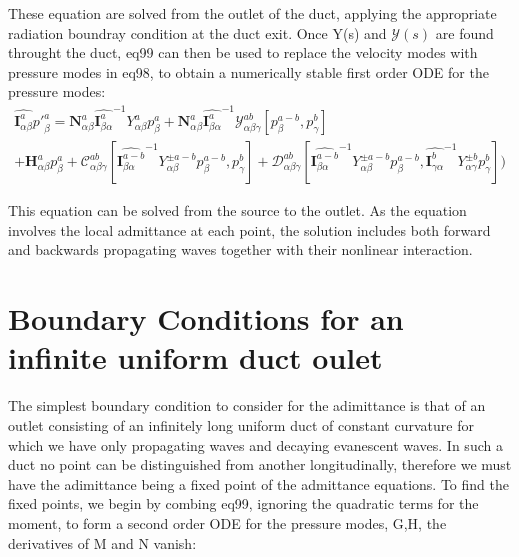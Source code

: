 \documentclass{Note}
\begin{document}
These equation are solved from the outlet of the duct, applying the appropriate radiation boundray condition at the duct exit. Once Y(s) and $\mathcal{Y}(s)$ are found throught the duct, eq99 can then be used to replace the velocity modes with pressure modes in eq98, to obtain a numerically stable first order ODE for the pressure modes:
\begin{equation}
\begin{aligned}
\widehat{\textbf{I}_{\alpha\beta}^a} {p'}_\beta^a=\textbf{N}_{\alpha\beta}^a {\widehat{\textbf{I}_{\beta \alpha}^a}}^{-1}  Y_{\alpha\beta}^a p_\beta^a +\textbf{N}_{\alpha\beta}^a {\widehat{\textbf{I}_{\beta \alpha}^a}}^{-1} \mathcal{Y}_{\alpha\beta\gamma}^{ab}[p_{\beta}^{a-b},p_{\gamma}^{b}]\\
+\textbf{H}_{\alpha\beta}^a p_\beta^a
+\mathcal{C}_{\alpha\beta\gamma}^{ab}[{\widehat{\textbf{I}_{\beta \alpha}^{a-b}}}^{-1}  Y_{\alpha\beta}^{\pm a-b} p_\beta^{a-b} ,p_{\gamma}^{b}]+\mathcal{D}_{\alpha\beta\gamma}^{ab}[{\widehat{\textbf{I}_{\beta \alpha}^{a-b}}}^{-1}  Y_{\alpha\beta}^{\pm a-b} p_\beta^{a-b},{\widehat{\textbf{I}_{\gamma \alpha}^{b}}}^{-1}  Y_{\alpha\gamma}^{\pm b} p_\gamma^{b}])
\end{aligned}
\end{equation}

This equation can be solved from the source to the outlet. As the equation involves the local admittance at each point, the solution includes both forward and backwards propagating waves together with their nonlinear interaction.







\section{Boundary Conditions for an infinite uniform duct oulet}

The simplest boundary condition to consider for the adimittance is that of an outlet consisting of an infinitely long uniform duct of constant curvature for which we have only propagating waves and decaying evanescent waves. In such a duct no point can be distinguished from another longitudinally, therefore we must have the adimittance being a fixed point of the admittance equations. To find the fixed points, we begin by combing eq99, ignoring the quadratic terms for the moment, to form a second order ODE for the pressure modes, G,H, the derivatives of M and N vanish:
\end{document}

